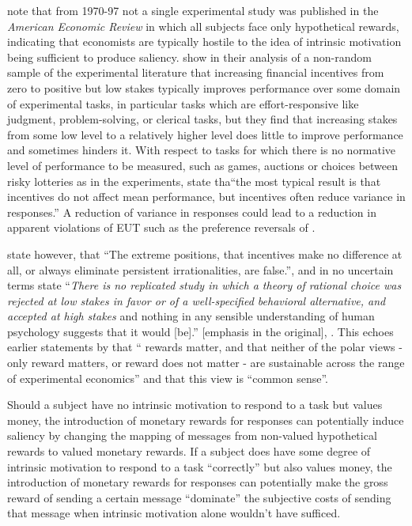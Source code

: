 \documentclass[11pt,a4paper]{report}
\begin{document}
\textcite[31]{Camerer1999} note that from 1970-97 not a single experimental study was published in the \textit{American Economic Review} in which all subjects face only hypothetical rewards, indicating that economists are typically hostile to the idea of intrinsic motivation being sufficient to produce saliency.
\textcite{Camerer1999} show in their analysis of a non-random sample of the experimental literature that increasing financial incentives from zero to positive but low stakes typically improves performance over some domain of experimental tasks, in particular tasks which are effort-responsive like judgment, problem-solving, or clerical tasks, but they find that increasing stakes from some low level to a relatively higher level does little to improve performance and sometimes hinders it.
With respect to tasks for which there is no normative level of performance to be measured, such as games, auctions or choices between risky lotteries as in the \textcite{Grether1979} experiments, \textcite[34]{Camerer1999} state tha\enquote{the most typical result is that incentives do not affect mean performance, but incentives often reduce variance in responses.}
A reduction of variance in responses could lead to a reduction in apparent violations of EUT such as the preference reversals of \textcite{Grether1979}.

\textcite[8]{Camerer1999} state however, that \enquote{The extreme positions, that  incentives make no difference at all, or always eliminate persistent irrationalities, are false.}, and in no uncertain terms state \enquote{\textit{There is no replicated study in which a theory of rational choice was rejected at low stakes in favor or of a well-specified behavioral alternative, and accepted at high stakes} \textelp{} and nothing in any sensible understanding of human psychology suggests that it would [be].} [emphasis in the original], \parencite*[33-34]{Camerer1999}.
This echoes earlier statements by \textcite[246]{Smith1993} that \enquote{\textelp{} rewards matter, and that neither of the polar views - only reward matters, or reward does not matter - are sustainable across the range of experimental economics} and that this view is \enquote{common sense}.

Should a subject have no intrinsic motivation to respond to a task but values money, the introduction of monetary rewards for responses can potentially induce saliency by changing the mapping of messages from non-valued hypothetical rewards to valued monetary rewards.
If a subject does have some degree of intrinsic motivation to respond to a task \enquote{correctly} but also values money, the introduction of monetary rewards for responses can potentially make the gross reward of sending a certain message \enquote{dominate} the subjective costs of sending that message when intrinsic motivation alone wouldn't have sufficed.
\end{document}

